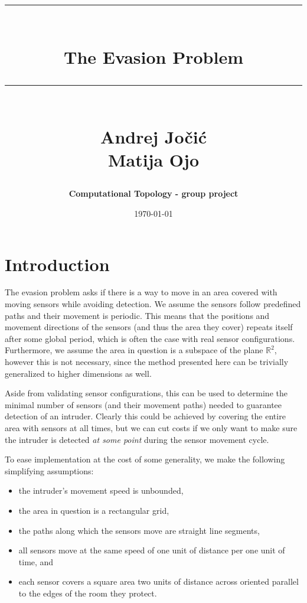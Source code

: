 \documentclass{article}
\makeatletter
\newcommand{\HRule}[1]{\rule{\linewidth}{#1}}
\renewcommand{\maketitle}{%
  \begin{center}
    \vspace*{3cm} %
    {\LARGE\@author\par}
    \vspace{1cm} %
    {\Huge\bfseries\@title\par}
    \vspace{2cm} %
    {\Large\@date\par}
  \end{center}
}
\makeatother
\begin{document}
\title{ \normalsize \textsc{}
\\ [0.5cm]
\HRule{1.0pt} \\
\Huge \textbf{The Evasion Problem}
\HRule{1.0pt}
\\ [1.5cm]
\LARGE{Andrej Jočić \\ Matija Ojo}
}
\author{\textbf{Computational Topology - group project}}
\date{\today}

\maketitle

\newpage


\section{Introduction}

The evasion problem asks if there is a way to move in an area covered with moving sensors while avoiding detection.
We assume the sensors follow predefined paths and their movement is periodic.
This means that the positions and movement directions of the sensors (and thus the area they cover) repeats itself after some global period, which is often the case with real sensor configurations.
Furthermore, we assume the area in question is a subspace of the plane $ \mathbb{R}^2 $, however this is not necessary, since the method presented here can be trivially generalized to higher dimensions as well.

Aside from validating sensor configurations, this can be used to determine the minimal number of sensors (and their movement paths) needed to guarantee detection of an intruder.
Clearly this could be achieved by covering the entire area with sensors at all times, but we can cut costs if we only want to make sure the intruder is detected {\it at some point} during the sensor movement cycle.

To ease implementation at the cost of some generality, we make the following simplifying assumptions:
\begin{itemize}
  \item the intruder's movement speed is unbounded,
  \item the area in question is a rectangular grid,
  \item the paths along which the sensors move are straight line segments,
  \item all sensors move at the same speed of one unit of distance per one unit of time, and
  \item each sensor covers a square area two units of distance across oriented parallel to the edges of the room they protect.
\end{itemize}
\end{document}
